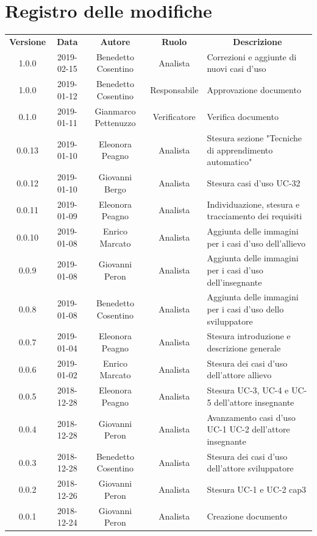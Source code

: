 \documentclass[11pt,a4paper]{article}
\begin{document}
	
	
	\newpage
	\section*{\centering Registro delle modifiche}
	\begin{tabularx}{\textwidth}{  c | c | c | c | X }
		\rowcolor{LightBlue}
		\color{white}\bfseries Versione & \color{white}\bfseries Data & \color{white}\bfseries Autore & \color{white}\bfseries Ruolo & \multicolumn{1}{c}{\color{white}\bfseries Descrizione}\\[0.25cm]
		1.0.0 & 2019-02-15 & Benedetto Cosentino & Analista & Correzioni e aggiunte di nuovi casi d'uso \\ \hline
		1.0.0 & 2019-01-12 & Benedetto Cosentino & Responsabile & Approvazione documento \\ \hline
		0.1.0 & 2019-01-11 & Gianmarco Pettenuzzo & Verificatore & Verifica documento \\ \hline
		0.0.13 & 2019-01-10 & Eleonora Peagno & Analista & Stesura sezione "Tecniche di apprendimento automatico" \\ \hline
		0.0.12 & 2019-01-10 & Giovanni Bergo & Analista & Stesura casi d'uso UC-32 \\ \hline
		0.0.11 & 2019-01-09 & Eleonora Peagno & Analista & Individuazione, stesura e tracciamento dei requisiti \\ \hline
		0.0.10 & 2019-01-08 & Enrico Marcato & Analista & Aggiunta delle immagini per i casi d'uso dell'allievo\\ \hline
		0.0.9 & 2019-01-08 & Giovanni Peron & Analista & Aggiunta delle immagini per i casi d'uso dell'insegnante\\ \hline
		0.0.8 & 2019-01-08 & Benedetto Cosentino & Analista & Aggiunta delle immagini per i casi d'uso dello sviluppatore\\ \hline
		0.0.7 & 2019-01-04 & Eleonora Peagno & Analista & Stesura introduzione e descrizione generale\\ \hline
		0.0.6 & 2019-01-02 & Enrico Marcato & Analista & Stesura dei casi d'uso dell'attore allievo\\ \hline
		0.0.5 & 2018-12-28 & Eleonora Peagno & Analista & Stesura UC-3, UC-4 e UC-5 dell'attore insegnante\\ \hline
		0.0.4 & 2018-12-28 & Giovanni Peron & Analista & Avanzamento casi d'uso UC-1 UC-2 dell'attore insegnante\\ \hline
		0.0.3 & 2018-12-28 & Benedetto Cosentino & Analista & Stesura dei casi d'uso dell'attore sviluppatore\\ \hline
		0.0.2 & 2018-12-26 & Giovanni Peron & Analista & Stesura UC-1 e UC-2 cap3\\ \hline
		0.0.1 & 2018-12-24 & Giovanni Peron & Analista & Creazione documento\\ \hline
	\end{tabularx}
	\newpage
	\tableofcontents
	\listoffigures
	\listoftables
	\newpage	
\end{document}
